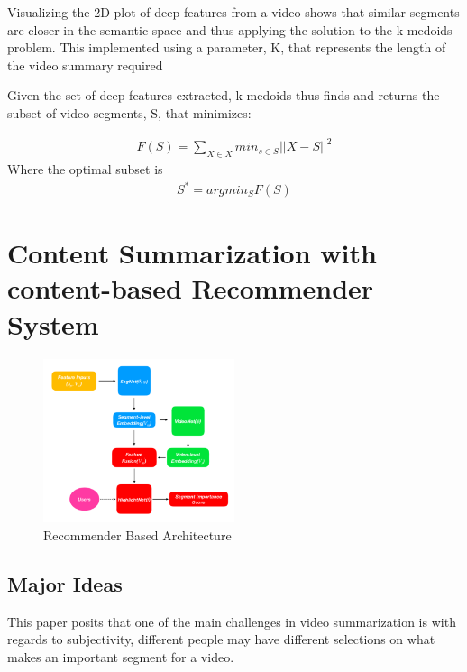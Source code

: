 					Visualizing the 2D plot of deep features from a video shows that similar segments are closer in the semantic space and thus applying the solution to the k-medoids problem. This implemented using a parameter, K, that represents the length of the video summary required
					
					Given the set of deep features extracted, k-medoids thus finds and returns the subset of video segments, S, that minimizes:
					
					\begin{align}
						F(S) = \sum_{X\in X}min_{s\in S}||X-S||^2
					\end{align}
				Where the optimal subset is 
					\begin{align}
						S^* = argmin_SF(S)
					\end{align}
					
\section{Content Summarization with content-based Recommender System \texorpdfstring{\cite{jiang_2019_comprehensive}}{}}
	\begin{figure}[ht]
	\centering
		\includegraphics[width=0.5\textwidth]{P2Arch}
	\caption{Recommender Based Architecture}
	\label{fig:p2arch}
    \end{figure}
	
    \subsection{Major Ideas}
    	This paper posits that one of the main challenges in video summarization is with regards to subjectivity, different people may have different selections on what makes an important segment for a video.
    	

